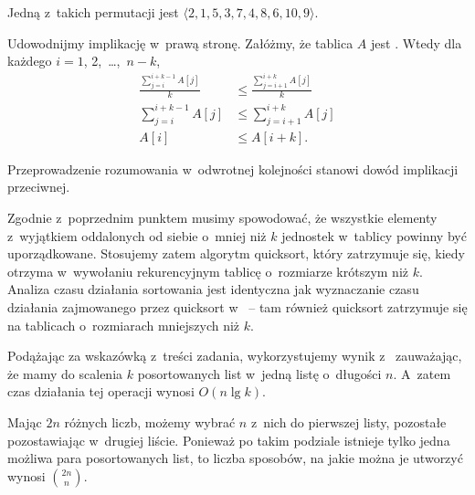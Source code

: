 \subproblem %
Jedną z~takich permutacji jest $\langle2,1,5,3,7,4,8,6,10,9\rangle$.

\subproblem %
Udowodnijmy implikację w~prawą stronę. Załóżmy, że tablica $A$ jest . Wtedy dla każdego $i=1$, 2,~\dots,~$n-k$,
\begin{align*}
	\frac{\sum_{j=i}^{i+k-1}A[j]}{k} &\le \frac{\sum_{j=i+1}^{i+k}A[j]}{k} \\[1mm]
	\sum_{j=i}^{i+k-1}A[j] &\le \sum_{j=i+1}^{i+k}A[j] \\[1mm]
	A[i] &\le A[i+k].
\end{align*}

Przeprowadzenie rozumowania w~odwrotnej kolejności stanowi dowód implikacji przeciwnej.

\subproblem %
Zgodnie z~poprzednim punktem musimy spowodować, że wszystkie elementy z~wyjątkiem oddalonych od siebie o~mniej niż $k$ jednostek w~tablicy powinny być uporządkowane. Stosujemy zatem algorytm quicksort, który zatrzymuje się, kiedy otrzyma w~wywołaniu rekurencyjnym tablicę o~rozmiarze krótszym niż $k$. Analiza czasu działania sortowania jest identyczna jak wyznaczanie czasu działania zajmowanego przez quicksort w~ -- tam również quicksort zatrzymuje się na tablicach o~rozmiarach mniejszych niż $k$.

\subproblem %
Podążając za wskazówką z~treści zadania, wykorzystujemy wynik z~ zauważając, że mamy do scalenia $k$ posortowanych list w~jedną listę o~długości $n$. A~zatem czas działania tej operacji wynosi $O(n\lg k)$.

\subproblem %


\subproblem %
Mając $2n$ różnych liczb, możemy wybrać $n$ z~nich do pierwszej listy, pozostałe pozostawiając w~drugiej liście. Ponieważ po takim podziale istnieje tylko jedna możliwa para posortowanych list, to liczba sposobów, na jakie można je utworzyć wynosi $\binom{2n}{n}$.

\subproblem %
\subproblem %
\subproblem %

\endinput
